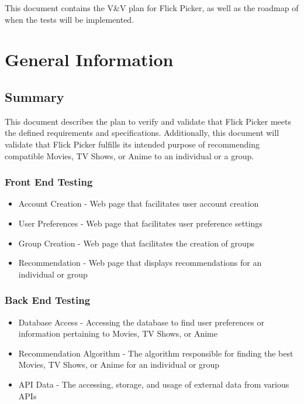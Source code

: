 \documentclass[12pt, titlepage]{article}
\begin{document}

\newpage


This document contains the V\&{}V plan for Flick Picker, as well as the roadmap of when the tests will be implemented.

\section{General Information}

\subsection{Summary}
This document describes the plan to verify and validate that Flick Picker meets the defined requirements and specifications. Additionally, this document will validate that Flick Picker fulfills its intended purpose of recommending compatible Movies, TV Shows, or Anime to an individual or a group.

\subsubsection{Front End Testing}
\begin{itemize}
	\item Account Creation - Web page that facilitates user account creation
	\item User Preferences - Web page that facilitates user preference settings
	\item Group Creation - Web page that facilitates the creation of groups
	\item Recommendation - Web page that displays recommendations for an individual or group
\end{itemize}
\subsubsection{Back End Testing}
\begin{itemize}
	\item Database Access - Accessing the database to find user preferences or information pertaining to Movies, TV Shows, or Anime
	\item Recommendation Algorithm - The algorithm responsible for finding the best Movies, TV Shows, or Anime for an individual or group
	\item API Data - The accessing, storage, and usage of external data from various APIs
\end{itemize}
\end{document}
